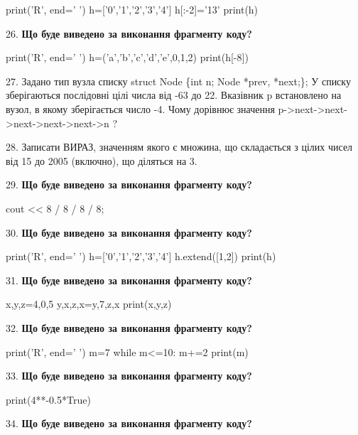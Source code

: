 \documentclass[11pt]{article}
\begin{document}
print('R', end=' ')
h=['0','1','2','3','4']
h[:-2]='13'
print(h)

\par\vspace{5mm}
26. \textbf{Що буде виведено за виконання фрагменту коду?}

print('R', end=' ')
h=('a','b','c','d','e',0,1,2)
print(h[-8])

\par\vspace{5mm}
27. 
Задано тип вузла списку
struct Node \{int n; Node *prev, *next;\};
У списку зберігаються послідовні цілі числа від -63 до 22. Вказівник p встановлено на вузол, в якому зберігається число -4.
Чому дорівнює значення p->next->next->next->next->next->n ?\par\vspace{5mm}
28. 
Записати ВИРАЗ, значенням якого є множина, що складається з цілих чисел від 15 до 2005 (включно), що діляться на 3.\par\vspace{5mm}
29. \textbf{Що буде виведено за виконання фрагменту коду?}

cout << 8 / 8 / 8 / 8;
\par\vspace{5mm}
30. \textbf{Що буде виведено за виконання фрагменту коду?}

print('R', end=' ')
h=['0','1','2','3','4']
h.extend([1,2])
print(h)

\par\vspace{5mm}
31. \textbf{Що буде виведено за виконання фрагменту коду?}

x,y,z=4,0,5
y,x,z,x=y,7,z,x
print(x,y,z)
\par\vspace{5mm}
32. \textbf{Що буде виведено за виконання фрагменту коду?}

print('R', end=' ')
m=7
while m<=10:
    m+=2
print(m)

\par\vspace{5mm}
33. \textbf{Що буде виведено за виконання фрагменту коду?}

print(4**-0.5*True)
\par\vspace{5mm}
34. \textbf{Що буде виведено за виконання фрагменту коду?}
\end{document}
